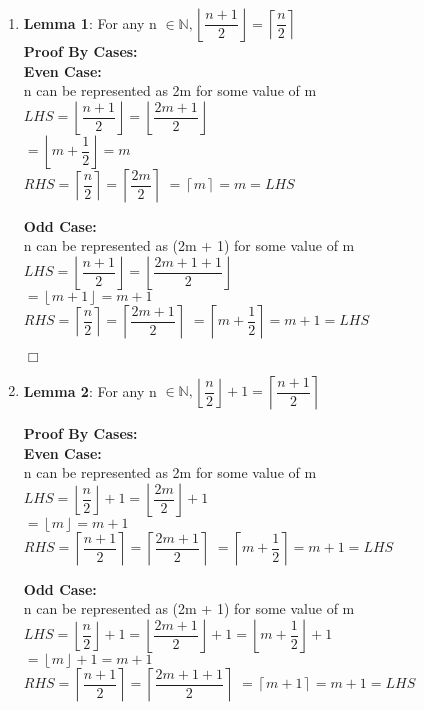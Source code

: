 \documentclass[12pt]{article}%
\begin{document}
\begin{enumerate}[label=(\alph*)]

\item
\textbf{Lemma 1}: For any n $\in \mathbb{N}, \left\lfloor\dfrac{n+1}{2}\right\rfloor = \left\lceil\dfrac{n}{2}\right\rceil$\\

\textbf{Proof By Cases:}\\
\textbf{Even Case:}\\
n can be represented as 2m for some value of m\\
$LHS = \left\lfloor\dfrac{n+1}{2}\right\rfloor = \left\lfloor\dfrac{2m+1}{2}\right\rfloor$\\
$=\left\lfloor m + \dfrac{1}{2}\right\rfloor = m$\\
$RHS = \left\lceil\dfrac{n}{2}\right\rceil = \left\lceil\dfrac{2m}{2}\right\rceil$
$=\left\lceil m \right\rceil = m = LHS$

\textbf{Odd Case:}\\
n can be represented as (2m + 1) for some value of m\\
$LHS = \left\lfloor\dfrac{n+1}{2}\right\rfloor = \left\lfloor\dfrac{2m +1+1}{2}\right\rfloor$\\
$=\left\lfloor m + 1\right\rfloor = m +1$\\
$RHS = \left\lceil\dfrac{n}{2}\right\rceil = \left\lceil\dfrac{2m +1}{2}\right\rceil$
$=\left\lceil m + \dfrac{1}{2} \right\rceil = m +1 = LHS$

$\Box$\\

\item
\textbf{Lemma 2}: For any n $\in \mathbb{N}, \left\lfloor\dfrac{n}{2}\right\rfloor + 1 = \left\lceil\dfrac{n+1}{2}\right\rceil$

\textbf{Proof By Cases:}\\
\textbf{Even Case:}\\
n can be represented as 2m for some value of m\\
$LHS = \left\lfloor\dfrac{n}{2}\right\rfloor +1= \left\lfloor\dfrac{2m}{2}\right\rfloor + 1$\\
$=\left\lfloor m \right\rfloor = m + 1$\\
$RHS = \left\lceil\dfrac{n + 1}{2}\right\rceil = \left\lceil\dfrac{2m + 1}{2}\right\rceil$
$=\left\lceil m + \dfrac{1}{2} \right\rceil = m + 1 = LHS$

\textbf{Odd Case:}\\
n can be represented as (2m + 1) for some value of m\\
$LHS = \left\lfloor\dfrac{n}{2}\right\rfloor + 1 = \left\lfloor\dfrac{2m + 1}{2}\right\rfloor + 1 = \left\lfloor m +\dfrac{1}{2}\right\rfloor + 1$\\
$=\left\lfloor m \right\rfloor + 1 = m +1$\\
$RHS = \left\lceil\dfrac{n + 1}{2}\right\rceil = \left\lceil\dfrac{2m + 1 +1}{2}\right\rceil$
$=\left\lceil m + 1 \right\rceil = m +1 = LHS$\\


\end{enumerate}
\end{document}
